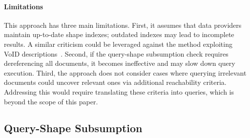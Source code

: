 
\paragraph{Limitations}
This approach has three main limitations.
First, it assumes that data providers maintain up-to-date shape indexes; outdated indexes may lead to incomplete results.
A similar criticism could be leveraged against the method exploiting \ac{VoID} descriptions~\cite{Montoya2017}.
Second, if the query-shape subsumption check requires dereferencing all documents, it becomes ineffective and may slow down query execution.
Third, the approach does not consider cases where querying irrelevant documents could uncover relevant ones via additional reachability criteria.
Addressing this would require translating these criteria into queries, which is beyond the scope of this paper.

\subsection{Query-Shape Subsumption}\label{sec:containment}


